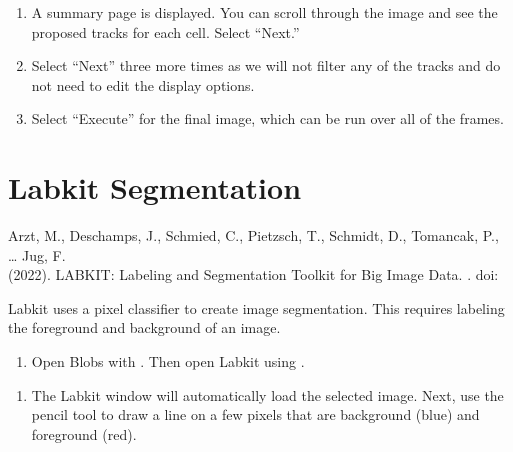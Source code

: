 \documentclass[letterpaper,10pt,english]{jupyterBook}
\begin{document}
\sphinxAtStartPar
{}
\begin{enumerate}
%
\setcounter{enumi}{9}
\item {} 
\sphinxAtStartPar
A summary page is displayed. You can scroll through the image and see the proposed tracks for each cell. Select “Next.”

\item {} 
\sphinxAtStartPar
Select “Next” three more times as we will not filter any of the tracks and do not need to edit the display options.

\item {} 
\sphinxAtStartPar
Select “Execute” for the final image, which can be run over all of the frames.

\end{enumerate}

\sphinxAtStartPar
{}

\sphinxstepscope


\chapter{Labkit Segmentation}
\label{\detokenize{labkit:labkit-segmentation}}\label{\detokenize{labkit::doc}}
\sphinxAtStartPar
{}

\sphinxAtStartPar
Arzt, M., Deschamps, J., Schmied, C., Pietzsch, T., Schmidt, D., Tomancak, P., … Jug, F.\\
(2022). LABKIT: Labeling and Segmentation Toolkit for Big Image Data. . doi:

\sphinxAtStartPar
Labkit uses a pixel classifier to create image segmentation. This requires labeling the foreground and background of an image.
\begin{enumerate}
%
\item {} 
\sphinxAtStartPar
Open Blobs with . Then open Labkit using .

\end{enumerate}

\sphinxAtStartPar
{}
\begin{enumerate}
%
\setcounter{enumi}{1}
\item {} 
\sphinxAtStartPar
The Labkit window will automatically load the selected image. Next, use the pencil tool to draw a line on a few pixels that are background (blue) and foreground (red).

\end{enumerate}
\end{document}
